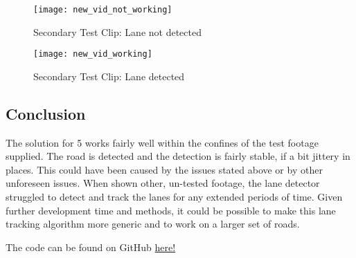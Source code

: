\documentclass[conference]{IEEEtran}
\begin{document}
\begin{figure}[H]
\centerline{\texttt{[image: new\_vid\_not\_working]}}
\caption{Secondary Test Clip: Lane not detected}
\label{fig:new_vid_not_working}
\end{figure}

\begin{figure}[H]
\centerline{\texttt{[image: new\_vid\_working]}}
\caption{Secondary Test Clip: Lane detected}
\label{fig:new_vid_working}
\end{figure}

\subsection{Conclusion}

The solution for 5 works fairly well within the confines of the test footage supplied. The road is detected and the detection is fairly stable, if a bit jittery in places. This could have been caused by the issues stated above or by other unforeseen issues. When shown other, un-tested footage, the lane detector struggled to detect and track the lanes for any extended periods of time. Given further development time and methods, it could be possible to make this lane tracking algorithm more generic and to work on a larger set of roads. 




The code can be found on GitHub \href{https://github.com/LukeDWaller99/Aint308}{here!} 

\onecolumn
\end{document}
